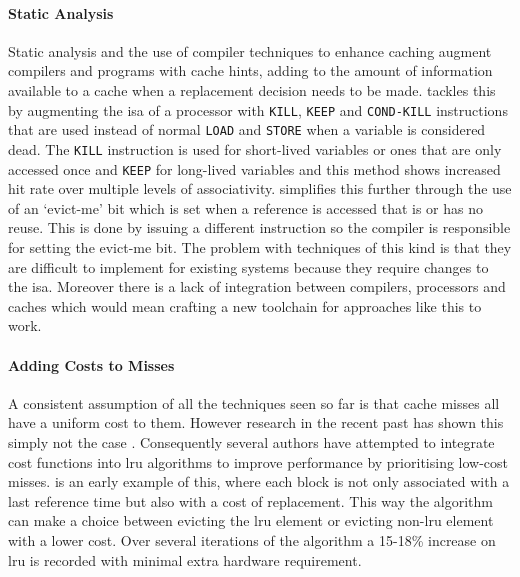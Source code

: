\paragraph{Static Analysis}

Static analysis and the use of compiler techniques to enhance caching augment compilers and programs with cache hints, adding to the amount of information available to a cache when a replacement decision needs to be made. \citet{jainSoftwareassistedCacheReplacement2001} tackles this by augmenting the \gls{isa} of a processor with \texttt{KILL}, \texttt{KEEP} and \texttt{COND-KILL} instructions that are used instead of normal \texttt{LOAD} and \texttt{STORE} when a variable is considered dead. The \texttt{KILL} instruction is used for short-lived variables or ones that are only accessed once and \texttt{KEEP} for long-lived variables and this method shows increased hit rate over multiple levels of associativity. \citet{wangUsingCompilerImprove2002} simplifies this further through the use of an `evict-me' bit which is set when a reference is accessed that is  or has no reuse. This is done by issuing a different instruction so the compiler is responsible for setting the evict-me bit. The problem with techniques of this kind is that they are difficult to implement for existing systems because they require changes to the \gls{isa}. Moreover there is a lack of integration between compilers, processors and caches which would mean crafting a new toolchain for approaches like this to work. 

\paragraph{Adding Costs to Misses}

A consistent assumption of all the techniques seen so far is that cache misses all have a uniform cost to them. However research in the recent past has shown this simply not the case \cite{qureshiCaseMLPAwareCache2006}. Consequently several authors have attempted to integrate cost functions into \gls{lru} algorithms to improve performance by prioritising low-cost misses. \citet{jeongCostsensitiveCacheReplacement2003} is an early example of this, where each block is not only associated with a last reference time but also with a cost of replacement. This way the algorithm can make a choice between evicting the \gls{lru} element or evicting non-\gls{lru} element with a lower cost. Over several iterations of the algorithm a 15-18\% increase on \gls{lru} is recorded with minimal extra hardware requirement. 


